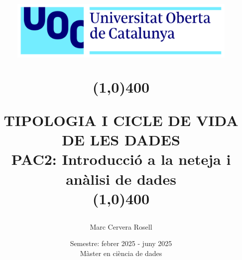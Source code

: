 \title{
	\begin{center}
	\vspace{3cm}
	\includegraphics[width=11cm, height=3cm]{images/Logo-uoc.png}
	\end{center}
	\begin{center}
	\line(1,0){400}
	\end{center}		
	TIPOLOGIA I CICLE DE VIDA DE LES DADES\\
	\vspace{2mm}
	\Large PAC2: Introducció a la neteja i anàlisi de dades\\
	\line(1,0){400}
	\vspace{2.5cm}
	}

\author{Marc Cervera Rosell \vspace{1cm}}


\date{Semestre: febrer 2025 - juny 2025\vspace{0.5cm} \\ Màster en ciència de dades}